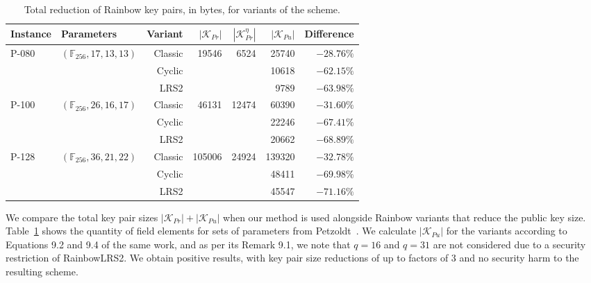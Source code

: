 \documentclass[draft, 12pt, a4paper, oneside]{memoir}
\theoremstyle{definition}
\theoremstyle{remark}
\begin{document}
\begin{table}[htbp]
  \renewcommand{\arraystretch}{1.2}
  \centering
  \caption{Total reduction of Rainbow key pairs, in bytes, for variants of the scheme.}\label{tab:2}
  \begin{tabular}{*{2}{l}*{5}{r}}
    \toprule
    Instance & Parameters & Variant & $|\mathcal{K}_{Pr}|$ & $|\mathcal{K}_{Pr} ^{\eta}|$ & $|\mathcal{K}_{Pu}|$ & Difference \\ \midrule
    \multirow{3}{*}{P-080}  & \multirow{3}{*}{$(\mathbb{F}_{256}, 17, 13, 13)$}  &  Classic &  \multirow{3}{*}{ 19546} &  \multirow{3}{*}{ 6524} &   25740 & $-28.76\%$ \\
                            &                                                    &   Cyclic &                          &                         &   10618 & $-62.15\%$ \\
                            &                                                    &     LRS2 &                          &                         &    9789 & $-63.98\%$ \\
    \multirow{3}{*}{P-100}  & \multirow{3}{*}{$(\mathbb{F}_{256}, 26, 16, 17)$}  &  Classic &  \multirow{3}{*}{ 46131} &  \multirow{3}{*}{12474} &   60390 & $-31.60\%$ \\
                            &                                                    &   Cyclic &                          &                         &   22246 & $-67.41\%$ \\
                            &                                                    &     LRS2 &                          &                         &   20662 & $-68.89\%$ \\
    \multirow{3}{*}{P-128}  & \multirow{3}{*}{$(\mathbb{F}_{256}, 36, 21, 22)$}  &  Classic &  \multirow{3}{*}{105006} &  \multirow{3}{*}{24924} &  139320 & $-32.78\%$ \\
                            &                                                    &   Cyclic &                          &                         &   48411 & $-69.98\%$ \\
                            &                                                    &     LRS2 &                          &                         &   45547 & $-71.16\%$ \\
    \bottomrule
  \end{tabular}
\end{table}

We compare the total key pair sizes $|\mathcal{K}_{Pr}| + |\mathcal{K}_{Pu}|$
when our method is used alongside Rainbow variants that reduce the public key
size. Table~\ref{tab:2} shows the quantity of field elements for sets of
parameters from Petzoldt~\cite[Table 9.8]{Petzoldt:201307}. We calculate
$|\mathcal{K}_{Pu}|$ for the variants according to Equations 9.2 and 9.4 of the
same work, and as per its Remark 9.1, we note that $q = 16$ and $q = 31$ are not
considered due to a security restriction of RainbowLRS2. We obtain positive
results, with key pair size reductions of up to factors of 3 and no security
harm to the resulting scheme.
\end{document}
